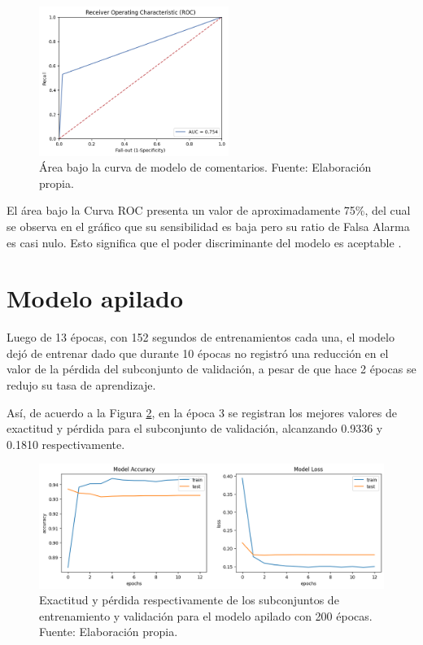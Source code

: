 \begin{figure}[!ht]
	\begin{center}
		\includegraphics[width=0.55\textwidth]{5/figures/comments_auc.png}
		\caption{Área bajo la curva de modelo de comentarios. Fuente: Elaboración propia.}
		\label{5:fig9}
	\end{center}
\end{figure}

El área bajo la Curva ROC presenta un valor de aproximadamente 75\%, del cual se observa en el gráfico que su sensibilidad es baja pero su ratio de Falsa Alarma es casi nulo. Esto significa que el poder discriminante del modelo es aceptable \parencite{bk_britos2006datamining}.

\section{Modelo apilado}
Luego de 13 épocas, con 152 segundos de entrenamientos cada una, el modelo dejó de entrenar dado que durante 10 épocas no registró una reducción en el valor de la pérdida del subconjunto de validación, a pesar de que hace 2 épocas se redujo su tasa de aprendizaje.

Así, de acuerdo a la Figura \ref{5:fig10}, en la época 3 se registran los mejores valores de exactitud y pérdida para el subconjunto de validación, alcanzando 0.9336 y 0.1810 respectivamente.

\begin{figure}[!ht]
	\begin{center}
		\includegraphics[width=1\textwidth]{5/figures/stacked_model_acc_loss.png}
		\caption{Exactitud y pérdida respectivamente de los subconjuntos de entrenamiento y validación para el modelo apilado con 200 épocas. Fuente: Elaboración propia.}
		\label{5:fig10}
	\end{center}
\end{figure}

